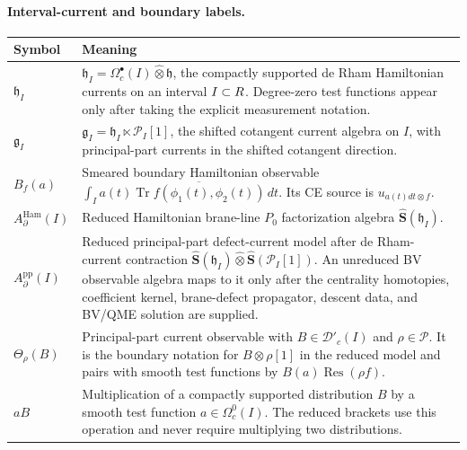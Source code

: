 \paragraph{Interval-current and boundary labels.}
\begin{center}
\begin{tabular}{@{}>{\raggedright\arraybackslash}p{}
  >{\raggedright\arraybackslash}p{}@{}}
\hline
\textbf{Symbol} & \textbf{Meaning}\\
\hline
\(\mathfrak h_I\) &
\(\mathfrak h_I=\Omega^\bullet_c(I)\widehat\otimes\mathfrak h\), the
compactly supported de Rham Hamiltonian currents on an interval
\(I\subset R\). Degree-zero test functions appear only after taking the
explicit measurement notation.\\
\hline
\(\mathfrak g_I\) &
\(\mathfrak g_I=\mathfrak h_I\ltimes\mathcal P_I[1]\), the shifted
cotangent current algebra on \(I\), with principal-part currents in the
shifted cotangent direction.\\
\hline
\(B_f(a)\) &
Smeared boundary Hamiltonian observable
\(\int_I a(t)\overline{\operatorname{Tr}f(\phi_1(t),\phi_2(t))}\,dt\).
Its CE source is \(u_{a(t)dt\otimes f}\).\\
\hline
\(A^{\mathrm{Ham}}_\partial(I)\) &
Reduced Hamiltonian brane-line \(P_0\) factorization algebra
\(\widehat{\mathbf S}(\mathfrak h_I)\).\\
\hline
\(A^{\mathrm{pp}}_\partial(I)\) &
Reduced principal-part defect-current model after de Rham-current contraction
\(\widehat{\mathbf S}(\mathfrak h_I)\widehat\otimes
\widehat{\mathbf S}(\mathcal P_I[1])\).  An unreduced BV observable
algebra maps to it only after the centrality homotopies, coefficient
kernel, brane-defect propagator, descent data, and BV/QME solution are
supplied.\\
\hline
\(\Theta_\rho(B)\) &
Principal-part current observable with
\(B\in\mathcal D'_c(I)\) and \(\rho\in\mathcal P\). It is the boundary
notation for \(B\otimes\rho[1]\) in the reduced model and pairs with
smooth test functions by \(B(a)\operatorname{Res}(\rho f)\).\\
\hline
\(aB\) &
Multiplication of a compactly supported distribution \(B\) by a smooth
test function \(a\in\Omega^0_c(I)\). The reduced brackets use this
operation and never require multiplying two distributions.\\
\hline
\end{tabular}
\end{center}
\endgroup
